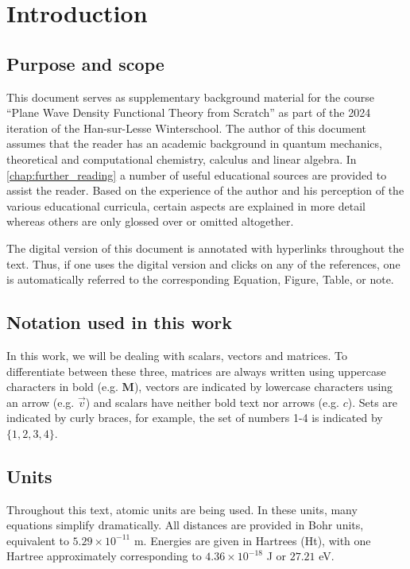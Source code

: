 %
%
%
\section{Introduction}

%
%
%
\subsection{Purpose and scope}

This document serves as supplementary background material for the  course ``Plane Wave Density Functional Theory from Scratch'' as part of the 2024 iteration of the Han-sur-Lesse Winterschool. The author of this document assumes that the reader has an academic background in quantum mechanics, theoretical and computational chemistry, calculus and linear algebra. In \cref{chap:further_reading} a number of useful educational sources are provided to assist the reader. Based on the experience of the author and his perception of the various educational curricula, certain aspects are explained in more detail whereas others are only glossed over or omitted altogether.

The digital version of this document is annotated with hyperlinks throughout the text. Thus, if one uses the digital version and clicks on any of the references, one is automatically referred to the corresponding Equation, Figure, Table, or note.

%
%
%
\subsection{Notation used in this work}

In this work, we will be dealing with scalars, vectors and matrices. To differentiate between these three, matrices are always written using uppercase characters in bold (e.g. $\mathbf{M}$), vectors are indicated by lowercase characters using an arrow (e.g. $\vec{v}$) and scalars have neither bold text nor arrows (e.g. $c$). Sets are indicated by curly braces, for example, the set of numbers 1-4 is indicated by $\{ 1,2,3,4 \}$.

%
%
%
\subsection{Units}
Throughout this text, atomic units are being used.\cite{szabo} In these units, many equations simplify dramatically. All distances are provided in Bohr units, equivalent to $5.29 \times 10^{-11}$ m. Energies are given in Hartrees (Ht), with one Hartree approximately corresponding to $4.36 \times 10^{-18}$ J or $27.21$ eV.


